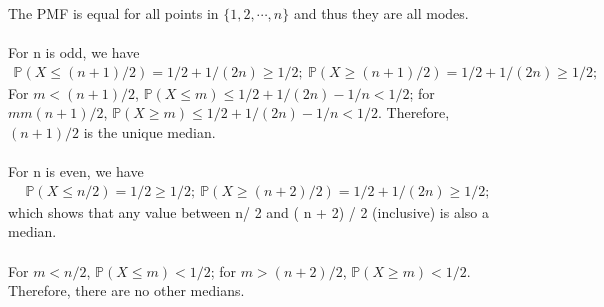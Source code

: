 
\setcounter{theorem}{4}
\begin{exercise} [BH.6.5] 
\begin{solution}
    The PMF is equal for all points in $\{1,2,\cdots,n \}$ and thus they are all modes. \\~\\
	For n is odd, we have 
	\begin{align*}
		\mathbb{P}\left(X\leq (n+1)/2 \right) = 1/2 + 1/(2n) \geq 1/2;~
		\mathbb{P}\left(X\geq (n+1)/2 \right) = 1/2 +1/(2n) \geq 1/2;~
	\end{align*}
	For $m<(n+1)/2$, $\mathbb{P}\left(X\leq m \right)\leq 1/2 + 1/(2n) -1/n <1/2 $; for $mm(n+1)/2$, $\mathbb{P}\left(X\geq m \right)\leq 1/2 + 1/(2n) -1/n <1/2 $. Therefore, $ (n+1)/2$ is the unique median. \\~\\
	For n is even, we have 
	\begin{align*}
		\mathbb{P}\left(X\leq n/2 \right) = 1/2  \geq 1/2;~
		\mathbb{P}\left(X\geq (n+2)/2 \right) = 1/2 + 1/(2n)  \geq 1/2;~
	\end{align*}
	which shows that any value between n/ 2 and ( n + 2) / 2 (inclusive) is also a median. \\~\\
	For $m<n/2$, $\mathbb{P}\left(X\leq m \right)  <1/2 $; for $m>(n+2)/2$, $\mathbb{P}\left(X\geq m \right) <1/2 $. Therefore, there are no other medians.
\end{solution}
\end{exercise}

